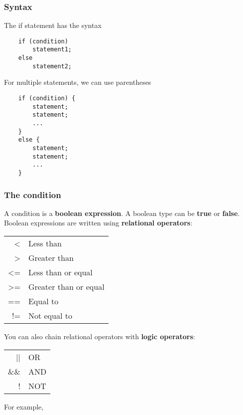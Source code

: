 \documentclass[]{article}
\begin{document}
\subsubsection{Syntax}
\bigbreak

The if statement has the syntax

\begin{lstlisting}
	if (condition)
		statement1;
	else
		statement2;
\end{lstlisting}
\bigbreak

For multiple statements, we can use parentheses

\begin{lstlisting}
	if (condition) {
		statement;
		statement;
		...
	}
	else {
		statement;
		statement;
		...
	}
\end{lstlisting}
\bigbreak


\subsubsection{The condition}
\bigbreak

A condition is a \textbf{boolean expression}. A boolean type can be \textbf{true} or \textbf{false}.\\

Boolean expressions are written using \textbf{relational operators}:

\begin{center}
	\begin{tabular}{rl}
		< & Less than \\
		> & Greater than\\
		<= & Less than or equal\\
		>= & Greater than or equal\\
		== & Equal to\\
		!= & Not equal to\\
	\end{tabular}
\end{center}

You can also chain relational operators with \textbf{logic operators}:\\
\begin{center}
	\begin{tabular}{rl}
		|| & OR \\
		\&\& & AND \\
		! & NOT \\
	\end{tabular}
\end{center}

For example,
\end{document}
